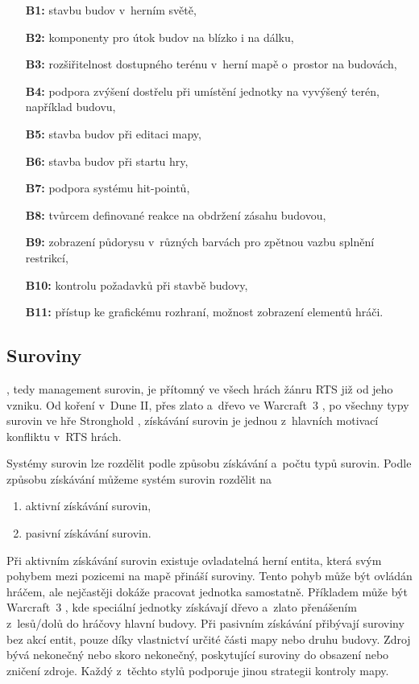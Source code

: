\begin{itemize}
	\item[\textbf{B1:}] stavbu budov v~herním světě,
	\item[\textbf{B2:}] komponenty pro útok budov na blízko i na dálku,
	\item[\textbf{B3:}] rozšiřitelnost dostupného terénu v~herní mapě o~prostor na budovách,
	\item[\textbf{B4:}] podpora zvýšení dostřelu při umístění jednotky na vyvýšený terén, například budovu,
	\item[\textbf{B5:}] stavba budov při editaci mapy,
	\item[\textbf{B6:}] stavba budov při startu hry,
	\item[\textbf{B7:}] podpora systému hit-pointů,
	\item[\textbf{B8:}] tvůrcem definované reakce na obdržení zásahu budovou,
	\item[\textbf{B9:}] zobrazení půdorysu v~různých barvách pro zpětnou vazbu splnění restrikcí,
	\item[\textbf{B10:}] kontrolu požadavků při stavbě budovy,
	\item[\textbf{B11:}] přístup ke grafickému rozhraní, možnost zobrazení elementů hráči.
\end{itemize}


\subsection{Suroviny}
\label{sec:suroviny}
 , tedy management surovin, je přítomný ve všech hrách žánru RTS již od jeho vzniku. Od koření v~Dune II, přes zlato a~dřevo ve Warcraft~3 \citep{site:warcraft3}, po všechny typy surovin ve hře Stronghold \citep{site:strongholdcrus}, získávání surovin je jednou z~hlavních motivací konfliktu v~RTS hrách. 

Systémy surovin lze rozdělit podle způsobu získávání a~počtu typů surovin. Podle způsobu získávání můžeme systém surovin rozdělit na
\begin{enumerate}
	\item aktivní získávání surovin,
	\item pasivní získávání surovin.
\end{enumerate}

Při aktivním získávání surovin existuje ovladatelná herní entita, která svým pohybem mezi pozicemi na mapě přináší suroviny. Tento pohyb může být ovládán hráčem, ale nejčastěji dokáže pracovat jednotka samostatně. Příkladem může být Warcraft~3 \citep{site:warcraft3}, kde speciální jednotky získávají dřevo a~zlato přenášením z~lesů/dolů do hráčovy hlavní budovy. Při pasivním získávání přibývají suroviny bez akcí entit, pouze díky vlastnictví určité části mapy nebo druhu budovy. Zdroj bývá nekonečný nebo skoro nekonečný, poskytující suroviny do obsazení nebo zničení zdroje. Každý z~těchto stylů podporuje jinou strategii kontroly mapy.

